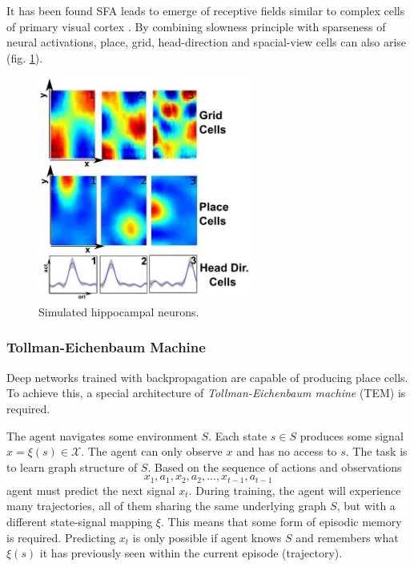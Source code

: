 \documentclass[12pt]{article}
\begin{document}
It has been found SFA leads to emerge of receptive fields similar to complex cells of primary visual cortex \cite{sfa_complex_cells}. 
By combining slowness principle with sparseness of neural activations, place, grid, head-direction and spacial-view cells can also arise \cite{slowness_sparseness} (fig. \ref{fig:sfa_place_cells}).
\begin{figure}[!htbp]
	\centering
	\includegraphics[width=7cm]{ sfa_place_cells}
	\caption{Simulated hippocampal neurons.}
	\label{fig:sfa_place_cells}
\end{figure}

\subsubsection{Tollman-Eichenbaum Machine}

Deep networks trained with backpropagation are capable of producing place cells. To achieve this, a special architecture of \textit{Tollman-Eichenbaum machine} (TEM) \cite{TEM} is required. 

The agent navigates some environment $S$. Each state $s\in S$ produces some signal $x = \xi(s) \in \mathcal{X}$. The agent can only observe $x$ and has no access to $s$. The task is to learn graph structure of $S$. Based on the sequence of actions and observations 
\[
x_1, a_1, x_2, a_2, ... , x_{t-1}, a_{t-1}
\]
agent must predict the next signal $x_{t}$. During training, the agent will experience many trajectories, all of them sharing the same underlying graph $S$, but with a different state-signal mapping $\xi$. This means that some form of episodic memory is required. Predicting $x_{t}$ is only possible if agent knows $S$ and remembers what $\xi(s)$ it has previously seen within the current episode (trajectory). 
\end{document}
